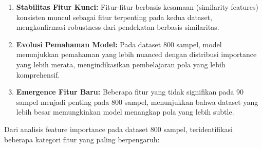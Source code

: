 \begin{enumerate}
    \item \textbf{Stabilitas Fitur Kunci:} Fitur-fitur berbasis kesamaan (similarity features) konsisten muncul sebagai fitur terpenting pada kedua dataset, mengkonfirmasi robustness dari pendekatan berbasis similaritas.
    
    \item \textbf{Evolusi Pemahaman Model:} Pada dataset 800 sampel, model menunjukkan pemahaman yang lebih nuanced dengan distribusi importance yang lebih merata, mengindikasikan pembelajaran pola yang lebih komprehensif.
    
    \item \textbf{Emergence Fitur Baru:} Beberapa fitur yang tidak signifikan pada 90 sampel menjadi penting pada 800 sampel, menunjukkan bahwa dataset yang lebih besar memungkinkan model menangkap pola yang lebih subtle.
\end{enumerate}

Dari analisis feature importance pada dataset 800 sampel, teridentifikasi beberapa kategori fitur yang paling berpengaruh:

